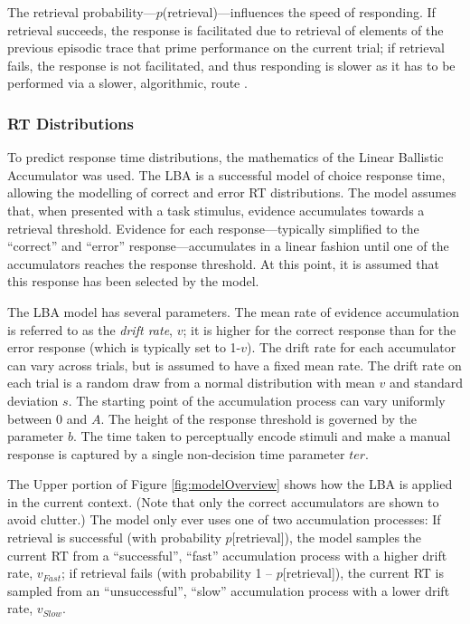 \documentclass[a4paper, jou, natbib]{apa6}
\begin{document}
The retrieval probability---$p$(retrieval)---influences the speed of responding. If retrieval succeeds, the response is facilitated due to retrieval of elements of the previous episodic trace that prime performance on the current trial; if retrieval fails, the response is not facilitated, and thus responding is slower as it has to be performed via a slower, algorithmic, route \citep[see][for discussion]{Grange2015}.

\subsubsection{RT Distributions}
To predict response time distributions, the mathematics of the Linear Ballistic Accumulator \citep{Brown2008} was used. The LBA is a successful model of choice response time, allowing the modelling of correct and error RT distributions. The model assumes that, when presented with a task stimulus, evidence accumulates towards a retrieval threshold. Evidence for each response---typically simplified to the ``correct'' and ``error'' response---accumulates in a linear fashion until one of the accumulators reaches the response threshold. At this point, it is assumed that this response has been selected by the model. 

The LBA model has several parameters. The mean rate of evidence accumulation is referred to as the \emph{drift rate}, $v$; it is higher for the correct response than for the error response (which is typically set to 1-$v$). The drift rate for each accumulator can vary across trials, but is assumed to have a fixed mean rate. The drift rate on each trial is a random draw from a normal distribution with mean $v$ and standard deviation $s$. The starting point of the accumulation process can vary uniformly between 0 and $A$. The height of the response threshold is governed by the parameter $b$. The time taken to perceptually encode stimuli and make a manual response is captured by a single non-decision time parameter $ter$. 

The Upper portion of Figure \ref{fig:modelOverview} shows how the LBA is applied in the current context. (Note that only the correct accumulators are shown to avoid clutter.) The model only ever uses one of two accumulation processes: If retrieval is successful (with probability $p$[retrieval]), the model samples the current RT from a ``successful'', ``fast'' accumulation process with a higher drift rate, $v_{Fast}$; if retrieval fails (with probability 1 -- $p$[retrieval]), the current RT is sampled from an ``unsuccessful'', ``slow'' accumulation process with a lower drift rate, $v_{Slow}$. 
\end{document}

